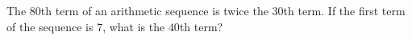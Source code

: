 The $80$th term of an arithmetic sequence is twice the $30$th term. If the first term of the sequence is $7$, what is the $40$th term?
